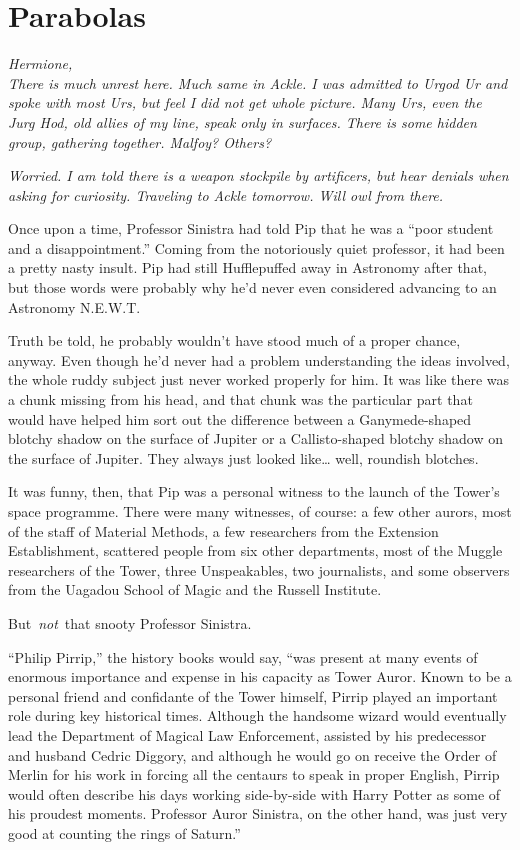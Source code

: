 \hypertarget{parabolas}{%
\chapter{Parabolas}\label{parabolas}}

\emph{Hermione,}\\
\emph{There is much unrest here. Much same in Ackle. I was admitted to
Urgod Ur and spoke with most Urs, but feel I did not get whole picture.
Many Urs, even the Jurg Hod, old allies of my line, speak only in
surfaces. There is some hidden group, gathering together. Malfoy?
Others?}

\emph{Worried. I am told there is a weapon stockpile by artificers, but
hear denials when asking for curiosity. Traveling to Ackle tomorrow.
Will owl from there.} 

\mybreak

Once upon a time, Professor Sinistra had told Pip that he was a ``poor
student and a disappointment.'' Coming from the notoriously quiet
professor, it had been a pretty nasty insult. Pip had still Hufflepuffed
away in Astronomy after that, but those words were probably why he'd
never even considered advancing to an Astronomy N.E.W.T.

Truth be told, he probably wouldn't have stood much of a proper chance,
anyway. Even though he'd never had a problem understanding the ideas
involved, the whole ruddy subject just never worked properly for him. It
was like there was a chunk missing from his head, and that chunk was the
particular part that would have helped him sort out the difference
between a Ganymede-shaped blotchy shadow on the surface of Jupiter or a
Callisto-shaped blotchy shadow on the surface of Jupiter. They always
just looked like\ldots{} well, roundish blotches.

It was funny, then, that Pip was a personal witness to the launch of the
Tower's space programme. There were many witnesses, of course: a few
other aurors, most of the staff of Material Methods, a few researchers
from the Extension Establishment, scattered people from six other
departments, most of the Muggle researchers of the Tower, three
Unspeakables, two journalists, and some observers from the Uagadou
School of Magic and the Russell Institute.

But~\emph{not}~that snooty Professor Sinistra.

``Philip Pirrip,'' the history books would say, ``was present at many
events of enormous importance and expense in his capacity as Tower
Auror. Known to be a personal friend and confidante of the Tower
himself, Pirrip played an important role during key historical times.
Although the handsome wizard would eventually lead the Department of
Magical Law Enforcement, assisted by his predecessor and husband Cedric
Diggory, and although he would go on receive the Order of Merlin for his
work in forcing all the centaurs to speak in proper English, Pirrip
would often describe his days working side-by-side with Harry Potter as
some of his proudest moments. Professor Auror Sinistra, on the other
hand, was just very good at counting the rings of Saturn.''

